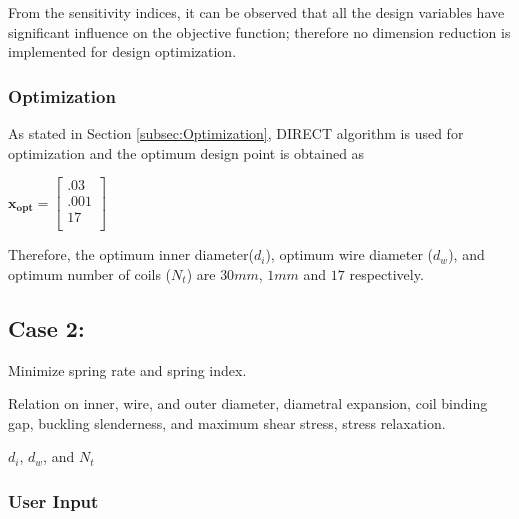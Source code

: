 \documentclass[10pt]{article}
\begin{document}
From the sensitivity indices, it can be observed that all the design variables have significant influence on the objective function; therefore no dimension reduction is implemented for design optimization. 

	\subsubsection{Optimization}
	
	As stated in Section \ref{subsec:Optimization}, DIRECT algorithm is used for optimization and the optimum design point is obtained as 
	\begin{center}
	$\mathbf{x_{opt}} =
	\left[
	\begin{array}{c}
	 	 .03 \\
	 	 .001 \\
		 17    \\ 
		
	 \end{array}
	 \right]
$	
\end{center}
    Therefore, the optimum inner diameter($d_{i}$), optimum wire diameter ($d_{w}$), and optimum number of coils ($N_{t}$) are $30 mm$, $1 mm$ and $17$ respectively.
		
\newpage

\subsection{Case 2:}
\label{subsec:Case2}
\vspace{-.1in}
\begin{description}[leftmargin=!,labelwidth=\widthof{\bfseries Design Variables:}, labelindent = 1cm]
	\item[Objectives:] Minimize spring rate and spring index.\\
	\item[Constraints:] Relation on inner, wire, and outer diameter, diametral expansion, coil binding gap, buckling slenderness, and maximum shear stress, stress relaxation. \\
	\item[Design Variables:] $d_{i}$, $d_{w}$, and $N_{t}$ \\
\end{description}

	\subsubsection{User Input}
	
\end{document}
